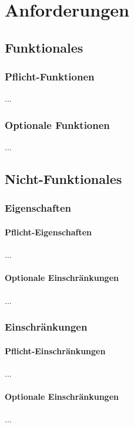 %
%


\chapter{Anforderungen}
\label{Anforderungen}


\section{Funktionales}

\subsection{Pflicht-Funktionen}

...
\\


\subsection{Optionale Funktionen}

...
\\



\section{Nicht-Funktionales}

\subsection{Eigenschaften}

\subsubsection{Pflicht-Eigenschaften}

...
\\


\subsubsection{Optionale Einschränkungen}

...
\\



\subsection{Einschränkungen}

\subsubsection{Pflicht-Einschränkungen}

...
\\


\subsubsection{Optionale Einschränkungen}

...
\\


